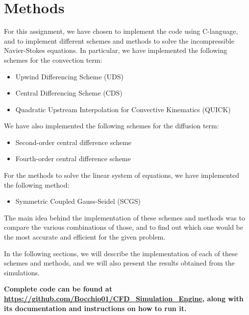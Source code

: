 \section{Methods}
\label{sec:methods}

For this assignment, we have chosen to implement the code using C-language, and to implement different schemes and methods to solve the incompressible Navier-Stokes equations.
In particular, we have implemented the following schemes for the convection term:

\begin{itemize}
    \item Upwind Differencing Scheme (UDS)
    \item Central Differencing Scheme (CDS)
    \item Quadratic Upstream Interpolation for Convective Kinematics (QUICK)
\end{itemize}

We have also implemented the following schemes for the diffusion term:

\begin{itemize}
    \item Second-order central difference scheme
    \item Fourth-order central difference scheme
\end{itemize}

For the methods to solve the linear system of equations, we have implemented the following method:

\begin{itemize}
    \item Symmetric Coupled Gauss-Seidel (SCGS)
\end{itemize}

The main idea behind the implementation of these schemes and methods was to compare the various combinations of those, and to find out which one would be the most accurate and efficient for the given problem.

In the following sections, we will describe the implementation of each of these schemes and methods, and we will also present the results obtained from the simulations.

\textbf{Complete code can be found at \url{https://github.com/Bocchio01/CFD_Simulation_Engine}, along with its documentation and instructions on how to run it.}